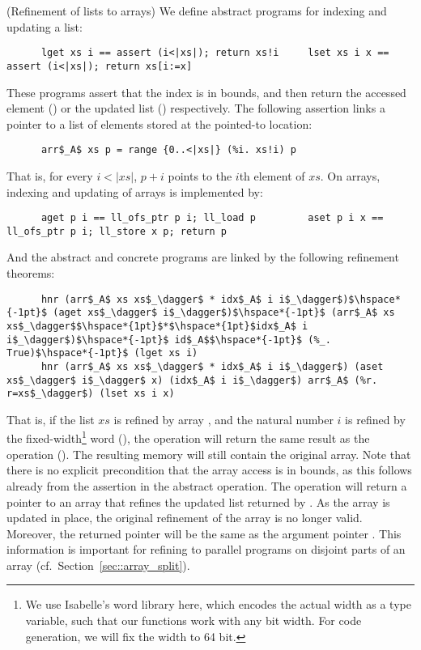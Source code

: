 \documentclass[a4paper,UKenglish,cleveref, autoref, thm-restate]{lipics-v2021}
\begin{document}
  \begin{example}(Refinement of lists to arrays)\label{ex:ref_array}
    We define abstract programs for indexing and updating a list:
    \begin{lstlisting}
      lget xs i == assert (i<|xs|); return xs!i     lset xs i x == assert (i<|xs|); return xs[i:=x]
    \end{lstlisting}
    These programs assert that the index is in bounds, and then return the accessed element ()
    or the updated list () respectively. The following assertion links a pointer to a list of
    elements stored at the pointed-to location:
    \begin{lstlisting}
      arr$_A$ xs p = range {0..<|xs|} (%i. xs!i) p
    \end{lstlisting}
    That is, for every $i<|xs|$, $p+i$ points to the $i$th element of $xs$.
    On arrays, indexing and updating of arrays is implemented by:
    \begin{lstlisting}
      aget p i == ll_ofs_ptr p i; ll_load p         aset p i x == ll_ofs_ptr p i; ll_store x p; return p
    \end{lstlisting}
    And the abstract and concrete programs are linked by the following refinement theorems:
    \begin{lstlisting}
      hnr (arr$_A$ xs xs$_\dagger$ * idx$_A$ i i$_\dagger$)$\hspace*{-1pt}$ (aget xs$_\dagger$ i$_\dagger$)$\hspace*{-1pt}$ (arr$_A$ xs xs$_\dagger$$\hspace*{1pt}$*$\hspace*{1pt}$idx$_A$ i i$_\dagger$)$\hspace*{-1pt}$ id$_A$$\hspace*{-1pt}$ (%_. True)$\hspace*{-1pt}$ (lget xs i)
      hnr (arr$_A$ xs xs$_\dagger$ * idx$_A$ i i$_\dagger$) (aset xs$_\dagger$ i$_\dagger$ x) (idx$_A$ i i$_\dagger$) arr$_A$ (%r. r=xs$_\dagger$) (lset xs i x)
    \end{lstlisting}
    That is, if the list \is$xs$ is refined by array , and the natural number \is$i$ is refined
    by the fixed-width\footnote{We use Isabelle's word library here, which encodes the actual width as a type variable,
    such that our functions work with any bit width. For code generation, we will fix the width to 64 bit.} word  (),
    the  operation will return the same result as the  operation ().
    The resulting memory will still contain the original array. Note that there is no explicit precondition that the array access
    is in bounds, as this follows already from the assertion in the abstract  operation.
    The  operation will return a pointer to an array that refines the updated list returned by .
    As the array is updated in place, the original refinement of the array is no longer valid.
    Moreover, the returned pointer  will be the same as the argument pointer .
    This information is important for refining to parallel programs on disjoint parts of an
    array (cf.\ Section~\ref{sec::array_split}).


\end{example}
\end{document}
